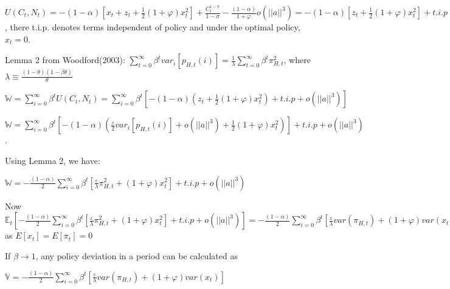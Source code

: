 \documentclass[
]{article}
\begin{document}
\(\displaystyle U(C_t,N_t) = -(1-\alpha)\left[ x_t+z_t + \frac{1}{2}(1+\varphi)x_t^2 \right] + \frac{C_t^{1-\sigma}}{1-\sigma}- \frac{(1-\alpha)}{1+\varphi} o(||a||^3)= -(1-\alpha)\left[ z_t + \frac{1}{2}(1+\varphi)x_t^2 \right] + t.i.p+ o(||a||^3)\),
there t.i.p. denotes terms independent of policy and under the optimal
policy, \(x_t=0\).

Lemma 2 from Woodford(2003):
\(\displaystyle \sum_{t=0}^\infty \beta^t var_i[p_{H,t}(i)]= \frac{1}{\lambda} \sum_{t=0}^\infty \beta^t \pi_{H,t}^2\),
where
\(\displaystyle \lambda \equiv \frac{(1-\theta)(1-\beta \theta)}{\theta}\)

\(\displaystyle \mathbb{W}= \sum_{i=0}^{\infty} \beta^tU(C_t,N_t) = \sum_{i=0}^{\infty} \beta^t \left[-(1-\alpha)\left( z_t + \frac{1}{2}(1+\varphi)x_t^2 \right) + t.i.p+ o(||a||^3) \right]\)

\(\displaystyle \mathbb{W}= \sum_{i=0}^{\infty} \beta^t \left[-(1-\alpha)\left( \frac{\varepsilon}{2}var_i[p_{H,t}(i)] +o(||a||^3) + \frac{1}{2}(1+\varphi)x_t^2 \right) \right]+ t.i.p+ o(||a||^3)\).

Using Lemma 2, we have:

\(\displaystyle \mathbb{W}= -\frac{(1-\alpha)}{2}\sum_{i=0}^{\infty} \beta^t \left[ \frac{\varepsilon}{\lambda}\pi_{H,t}^2+ (1+\varphi)x_t^2 \right] + t.i.p+ o(||a||^3)\)

Now
\(\displaystyle \mathbb{E}_t \left[ -\frac{(1-\alpha)}{2}\sum_{i=0}^{\infty} \beta^t \left[ \frac{\varepsilon}{\lambda}\pi_{H,t}^2+ (1+\varphi)x_t^2 \right] + t.i.p+ o(||a||^3) \right] = -\frac{(1-\alpha)}{2}\sum_{i=0}^{\infty} \beta^t \left[ \frac{\varepsilon}{\lambda}var(\pi_{H,t})+ (1+\varphi)var(x_t) \right]\)
as \(E[x_t]=E[\pi_t]=0\)

If \(\beta \to 1\), any policy deviation in a period can be calculated
as

\(\displaystyle \mathbb{V} = -\frac{(1-\alpha)}{2}\sum_{i=0}^{\infty} \beta^t \left[ \frac{\varepsilon}{\lambda}var(\pi_{H,t})+ (1+\varphi)var(x_t) \right]\)
\end{document}
